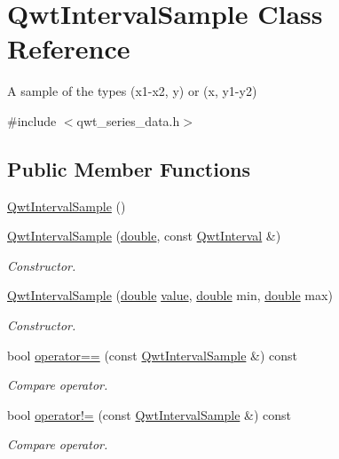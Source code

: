 \hypertarget{class_qwt_interval_sample}{\section{Qwt\-Interval\-Sample Class Reference}
\label{class_qwt_interval_sample}
}


A sample of the types (x1-\/x2, y) or (x, y1-\/y2)  




{\ttfamily \#include $<$qwt\-\_\-series\-\_\-data.\-h$>$}

\subsection*{Public Member Functions}
\begin{DoxyCompactItemize}
\item 
\hyperlink{class_qwt_interval_sample_a9f1259560f2628f8d32a648076c09d23}{Qwt\-Interval\-Sample} ()
\item 
\hyperlink{class_qwt_interval_sample_a1e17c77625481f0987ed0bc7f461499c}{Qwt\-Interval\-Sample} (\hyperlink{_super_l_u_support_8h_a8956b2b9f49bf918deed98379d159ca7}{double}, const \hyperlink{class_qwt_interval}{Qwt\-Interval} \&)
\begin{DoxyCompactList}\small\item\em Constructor. \end{DoxyCompactList}\item 
\hyperlink{class_qwt_interval_sample_a02e2490f2bbc671a1a771c53ab2889da}{Qwt\-Interval\-Sample} (\hyperlink{_super_l_u_support_8h_a8956b2b9f49bf918deed98379d159ca7}{double} \hyperlink{glext_8h_aa0e2e9cea7f208d28acda0480144beb0}{value}, \hyperlink{_super_l_u_support_8h_a8956b2b9f49bf918deed98379d159ca7}{double} min, \hyperlink{_super_l_u_support_8h_a8956b2b9f49bf918deed98379d159ca7}{double} max)
\begin{DoxyCompactList}\small\item\em Constructor. \end{DoxyCompactList}\item 
bool \hyperlink{class_qwt_interval_sample_a3ef77fe5326a1fdd4b0428b3093a0e25}{operator==} (const \hyperlink{class_qwt_interval_sample}{Qwt\-Interval\-Sample} \&) const 
\begin{DoxyCompactList}\small\item\em Compare operator. \end{DoxyCompactList}\item 
bool \hyperlink{class_qwt_interval_sample_a17e9ce13c70d8f5e369ee8ba6aec6e41}{operator!=} (const \hyperlink{class_qwt_interval_sample}{Qwt\-Interval\-Sample} \&) const 
\begin{DoxyCompactList}\small\item\em Compare operator. \end{DoxyCompactList}\end{DoxyCompactItemize}

